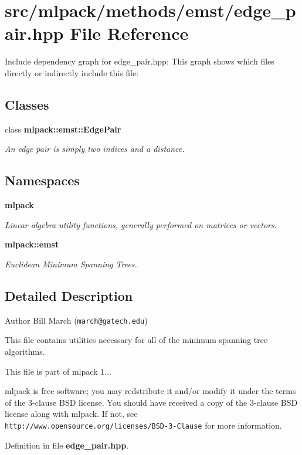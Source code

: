 \section{src/mlpack/methods/emst/edge\-\_\-pair.hpp File Reference}
\label{edge__pair_8hpp}
Include dependency graph for edge\-\_\-pair.\-hpp\-:
This graph shows which files directly or indirectly include this file\-:
\subsection*{Classes}
\begin{DoxyCompactItemize}
\item 
class {\bf mlpack\-::emst\-::\-Edge\-Pair}
\begin{DoxyCompactList}\small\item\em An edge pair is simply two indices and a distance. \end{DoxyCompactList}\end{DoxyCompactItemize}
\subsection*{Namespaces}
\begin{DoxyCompactItemize}
\item 
{\bf mlpack}
\begin{DoxyCompactList}\small\item\em Linear algebra utility functions, generally performed on matrices or vectors. \end{DoxyCompactList}\item 
{\bf mlpack\-::emst}
\begin{DoxyCompactList}\small\item\em Euclidean Minimum Spanning Trees. \end{DoxyCompactList}\end{DoxyCompactItemize}


\subsection{Detailed Description}
\begin{DoxyAuthor}{Author}
Bill March ({\tt march@gatech.\-edu})
\end{DoxyAuthor}
This file contains utilities necessary for all of the minimum spanning tree algorithms.

This file is part of mlpack 1...

mlpack is free software; you may redstribute it and/or modify it under the terms of the 3-\/clause B\-S\-D license. You should have received a copy of the 3-\/clause B\-S\-D license along with mlpack. If not, see {\tt http\-://www.\-opensource.\-org/licenses/\-B\-S\-D-\/3-\/\-Clause} for more information. 

Definition in file {\bf edge\-\_\-pair.\-hpp}.

